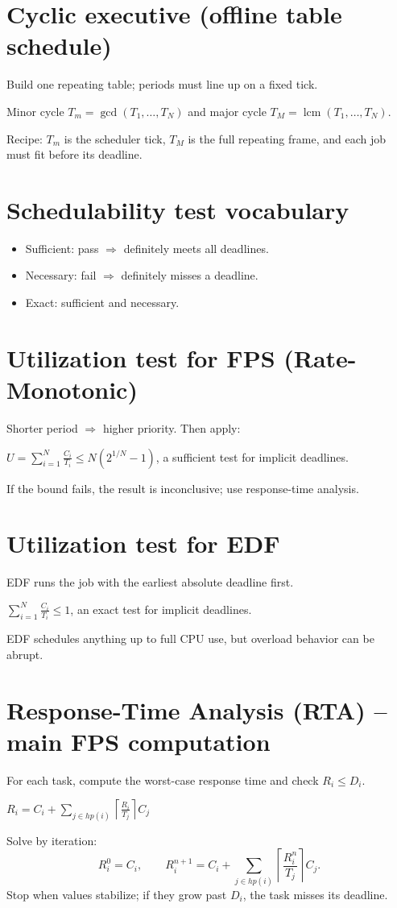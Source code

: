 \section{Cyclic executive (offline table schedule)}
Build one repeating table; periods must line up on a fixed tick.
\begin{keybox}
Minor cycle $T_m=\gcd(T_1,\dots,T_N)$ and major cycle $T_M=\operatorname{lcm}(T_1,\dots,T_N)$.
\end{keybox}
Recipe: $T_m$ is the scheduler tick, $T_M$ is the full repeating frame, and each job must fit before its deadline.

\section{Schedulability test vocabulary}
\begin{itemize}
\item Sufficient: pass $\Rightarrow$ definitely meets all deadlines.
\item Necessary: fail $\Rightarrow$ definitely misses a deadline.
\item Exact: sufficient and necessary.
\end{itemize}

\section{Utilization test for FPS (Rate-Monotonic)}
Shorter period $\Rightarrow$ higher priority. Then apply:
\begin{keybox}
$U=\displaystyle\sum_{i=1}^N\frac{C_i}{T_i}\le N\left(2^{1/N}-1\right)$, a sufficient test for implicit deadlines.
\end{keybox}
If the bound fails, the result is inconclusive; use response-time analysis.

\section{Utilization test for EDF}
EDF runs the job with the earliest absolute deadline first.
\begin{keybox}
$\displaystyle\sum_{i=1}^N\frac{C_i}{T_i}\le 1$, an exact test for implicit deadlines.
\end{keybox}
EDF schedules anything up to full CPU use, but overload behavior can be abrupt.

\section{Response-Time Analysis (RTA) -- main FPS computation}
For each task, compute the worst-case response time and check $R_i\le D_i$.
\begin{keybox}
$R_i=C_i+\displaystyle\sum_{j\in hp(i)}\left\lceil\frac{R_i}{T_j}\right\rceil C_j$
\end{keybox}
Solve by iteration:
\[
R_i^{0}=C_i,\qquad
R_i^{n+1}=C_i+\sum_{j\in hp(i)}\left\lceil\frac{R_i^{n}}{T_j}\right\rceil C_j.
\]
Stop when values stabilize; if they grow past $D_i$, the task misses its deadline.

